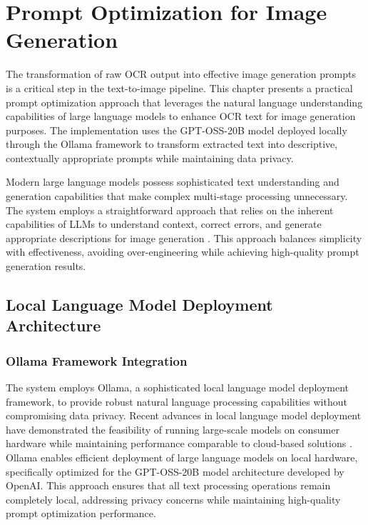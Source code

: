 \chapter{Prompt Optimization for Image Generation}

The transformation of raw OCR output into effective image generation prompts is a critical step in the text-to-image pipeline. This chapter presents a practical prompt optimization approach that leverages the natural language understanding capabilities of large language models to enhance OCR text for image generation purposes. The implementation uses the GPT-OSS-20B model deployed locally through the Ollama framework to transform extracted text into descriptive, contextually appropriate prompts while maintaining data privacy.

Modern large language models possess sophisticated text understanding and generation capabilities that make complex multi-stage processing unnecessary. The system employs a straightforward approach that relies on the inherent capabilities of LLMs to understand context, correct errors, and generate appropriate descriptions for image generation \cite{wang2024survey, chen2024llm}. This approach balances simplicity with effectiveness, avoiding over-engineering while achieving high-quality prompt generation results.

\section{Local Language Model Deployment Architecture}

\subsection{Ollama Framework Integration}

The system employs Ollama, a sophisticated local language model deployment framework, to provide robust natural language processing capabilities without compromising data privacy. Recent advances in local language model deployment have demonstrated the feasibility of running large-scale models on consumer hardware while maintaining performance comparable to cloud-based solutions \cite{ganjdanesh2024prompt}. Ollama enables efficient deployment of large language models on local hardware, specifically optimized for the GPT-OSS-20B model architecture developed by OpenAI. This approach ensures that all text processing operations remain completely local, addressing privacy concerns while maintaining high-quality prompt optimization performance.


